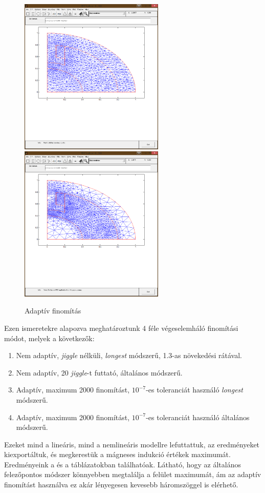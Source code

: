 \begin{figure}[!h]
	\centering
	\includegraphics[trim = 15mm 80mm 10mm 40mm,clip, width=69mm, keepaspectratio]{figures/terek/mesh1.png}\hspace{5mm}
	\includegraphics[trim = 15mm 80mm 10mm 40mm,clip, width=69mm, keepaspectratio]{figures/terek/mesh2.png}
	\caption{Adaptív finomítás}
	\label{fig:adaptive}
\end{figure}
\newpage
Ezen ismeretekre alapozva meghatároztunk 4 féle végeselemháló finomítási módot, melyek a következők:


\begin{enumerate}
	\item Nem adaptív, \textit{jiggle} nélküli, \textit{longest} módszerű, 1.3-as növekedési rátával.
	\item Nem adaptív, 20 \textit{jiggle}-t futtató, általános módszerű.
	\item Adaptív, maximum 2000 finomítást, $ 10^{-7} $-es toleranciát használó \textit{longest} módszerű.
	\item Adaptív, maximum 2000 finomítást, $ 10^{-7} $-es toleranciát használó általános módszerű.
\end{enumerate}
Ezeket mind a lineáris, mind a nemlineáris modellre lefuttattuk, az eredményeket kiexportáltuk, és megkerestük a mágneses indukció értékek maximumát. Eredményeink a  és a  táblázatokban találhatóak. Látható, hogy az általános felezőpontos módszer könnyebben megtalálja a felület maximumát, ám az adaptív finomítást használva ez akár lényegesen kevesebb háromszöggel is elérhető.

